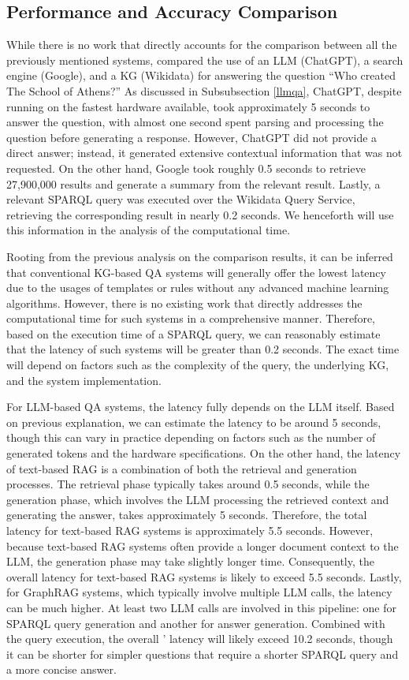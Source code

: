 \subsection{Performance and Accuracy Comparison}
While there is no work that directly accounts for the comparison between
all the previously mentioned systems, \cite{vrandecicyoutube} compared
the use of an LLM (ChatGPT), a search engine (Google), and a KG (Wikidata)
for answering the question ``Who created The School of Athens?'' As discussed in
Subsubsection \ref{llmqa}, ChatGPT, despite running on the fastest hardware
available, took approximately 5 seconds to answer the question, with
almost one second spent parsing and processing the question before 
generating a response. However, ChatGPT did not provide a direct answer; 
instead, it generated extensive contextual information that was not 
requested. On the other hand, Google took roughly 0.5 seconds to retrieve
27,900,000 results and generate a summary from the relevant result. Lastly, 
a relevant SPARQL query was executed over the Wikidata Query Service, 
retrieving the corresponding result in nearly 0.2 seconds. We henceforth
will use this information in the analysis of the computational time. 

Rooting from the previous analysis on the comparison results, it can be 
inferred that conventional KG-based QA systems will generally offer the 
lowest latency due to the usages of templates or rules without any advanced
machine learning algorithms. However, there is no
existing work that directly addresses the computational time for such systems
in a comprehensive manner. Therefore, based on the execution time of a
SPARQL query, we can reasonably estimate that
the latency of such systems will be greater than 0.2 seconds. The exact 
time will depend on factors such as the complexity of the query, the 
underlying KG, and the system implementation.

For LLM-based QA systems, the latency fully depends on the LLM itself.
Based on previous explanation, we can estimate the latency
to be around 5 seconds, though this can vary in practice depending
on factors such as the number of generated tokens and the hardware
specifications. On the other hand, the latency of text-based RAG
is a combination of both the retrieval and generation processes.
The retrieval phase typically takes around 0.5 seconds, while the 
generation phase, which involves the LLM processing the retrieved 
context and generating the answer, takes approximately 5 seconds. 
Therefore, the total latency for text-based RAG systems is 
approximately 5.5 seconds. However, because text-based RAG systems 
often provide a longer document context to the LLM, the generation 
phase may take slightly longer time. Consequently, the overall 
latency for text-based RAG systems is likely to exceed 5.5 seconds.
Lastly, for GraphRAG systems, which typically involve multiple 
LLM calls, the latency can be much higher. At least two LLM calls are 
involved in this pipeline: one for SPARQL query generation and another 
for answer generation. Combined with the query execution, the overall '
latency will likely exceed 10.2 seconds, though it can be shorter for 
simpler questions that require a shorter SPARQL query and a more 
concise answer.

